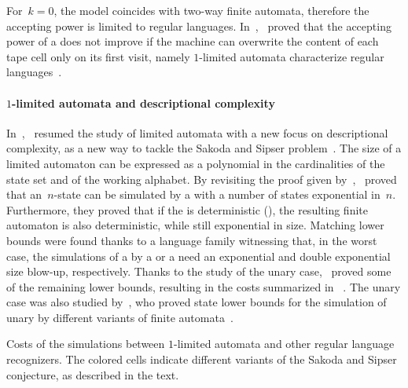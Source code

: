 For~$k=0$, the model coincides with two-way finite automata, therefore the accepting power is limited to regular languages.
In~\citeyear{WagWec86},~\citeauthor{WagWec86} proved that the accepting power of a \TNFA does not improve if the machine can overwrite the content of each tape cell only on its first visit, namely $1$-limited automata characterize regular languages~\cite{WagWec86}.

\paragraph{$1$-limited automata and descriptional complexity}
In~\citeyear{PigPis14},~\citeauthor{PigPis14} resumed the study of limited automata with a new focus on descriptional complexity, as a new way to tackle the Sakoda and Sipser problem~\cite{PigPis14}.
The size of a limited automaton can be expressed as a polynomial in the cardinalities of the state set and of the working alphabet.
By revisiting the proof given by~\citeauthor{WagWec86},~\citeauthor{PigPis14} proved that an~$n$-state \OLA can be simulated by a \ONFA with a number of states exponential in~$n$.
Furthermore, they proved that if the \OLA is deterministic (\ODLA), the resulting finite automaton is also deterministic, while still exponential in size.
Matching lower bounds were found thanks to a language family witnessing that, in the worst case, the simulations of a \OLA by a \ONFA or a \ODFA need an exponential and double exponential size blow-up, respectively.
Thanks to the study of the unary case,~\citeauthor{PigPri19} proved some of the remaining lower bounds, resulting in the costs summarized in ~\cite{PigPri19}.
The unary case was also studied by~\citeauthor{KutWen15}, who proved state lower bounds for the simulation of unary \kLA by different variants of finite automata~\cite{KutWen15}.

\begin{table}
	\centering
	\caption[Costs of the simulations between $1$-limited automata and other regular language recognizers.]{Costs of the simulations between $1$-limited automata and other regular language recognizers.
		The colored cells indicate different variants of the Sakoda and Sipser conjecture, as described in the text.}
	\label{tab:sims-1la-general-context}
\end{table}

